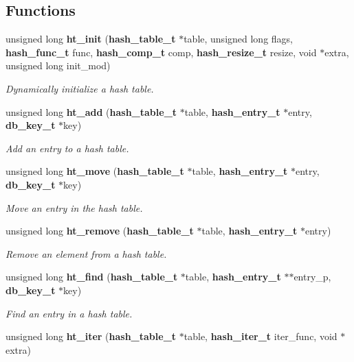 \subsection*{Functions}
\begin{CompactItemize}
\item 
unsigned long {\bf ht\_\-init} ({\bf hash\_\-table\_\-t} $\ast$table, unsigned long flags, {\bf hash\_\-func\_\-t} func, {\bf hash\_\-comp\_\-t} comp, {\bf hash\_\-resize\_\-t} resize, void $\ast$extra, unsigned long init\_\-mod)
\begin{CompactList}\small\item\em Dynamically initialize a hash table.\item\end{CompactList}\item 
unsigned long {\bf ht\_\-add} ({\bf hash\_\-table\_\-t} $\ast$table, {\bf hash\_\-entry\_\-t} $\ast$entry, {\bf db\_\-key\_\-t} $\ast$key)
\begin{CompactList}\small\item\em Add an entry to a hash table.\item\end{CompactList}\item 
unsigned long {\bf ht\_\-move} ({\bf hash\_\-table\_\-t} $\ast$table, {\bf hash\_\-entry\_\-t} $\ast$entry, {\bf db\_\-key\_\-t} $\ast$key)
\begin{CompactList}\small\item\em Move an entry in the hash table.\item\end{CompactList}\item 
unsigned long {\bf ht\_\-remove} ({\bf hash\_\-table\_\-t} $\ast$table, {\bf hash\_\-entry\_\-t} $\ast$entry)
\begin{CompactList}\small\item\em Remove an element from a hash table.\item\end{CompactList}\item 
unsigned long {\bf ht\_\-find} ({\bf hash\_\-table\_\-t} $\ast$table, {\bf hash\_\-entry\_\-t} $\ast$$\ast$entry\_\-p, {\bf db\_\-key\_\-t} $\ast$key)
\begin{CompactList}\small\item\em Find an entry in a hash table.\item\end{CompactList}\item 
unsigned long {\bf ht\_\-iter} ({\bf hash\_\-table\_\-t} $\ast$table, {\bf hash\_\-iter\_\-t} iter\_\-func, void $\ast$extra)
$$
\end{CompactItemize}

